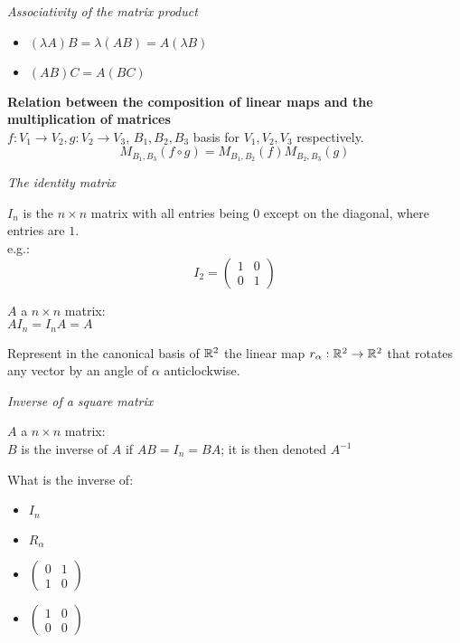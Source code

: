 \textit{Associativity of the matrix product}
\begin{itemize}
	\item $(\lambda A)B = \lambda(AB) = A(\lambda B)$
	\item $(AB)C = A(BC)$
\end{itemize}

\textbf{Relation between the composition of linear maps and the multiplication of matrices}\\
$f:V_1 \to V_2, g:V_2 \to V_3$, $B_1,B_2,B_3$ basis for $V_1,V_2,V_3$ respectively.
$$
M_{B_1,B_3}(f \circ g)=M_{B_1,B_2}(f)M_{B_2,B_3}(g)
$$

\textit{The identity matrix}
\begin{definition}
	$I_n$ is the $n \times n$ matrix with all entries being $0$ except on the diagonal, where entries are $1$.\\
	e.g.:
	$$
	I_2 = 
	\begin{pmatrix}
		1&0\\
		0&1
	\end{pmatrix}
	$$
\end{definition}
\begin{property}
	$A$ a $n \times n$ matrix:\\
	$A I_n = I_n A = A$
\end{property}

\begin{exercise}
	Represent in the canonical basis of $\mathbb{R}^2$ the linear map $r_\alpha: \mathbb{R}^2 \to \mathbb{R}^2$ that rotates any vector by an angle of $\alpha$ anticlockwise.
\end{exercise}

\textit{Inverse of a square matrix}
\begin{definition}
	$A$ a $n \times n$ matrix:\\
	$B$ is the inverse of $A$ if $AB = I_n = BA$; it is then denoted $A^{-1}$
\end{definition}
\begin{question}
	What is the inverse of:
	\begin{itemize}
		\item $I_n$
		\item $R_\alpha$
		\item $\begin{pmatrix} 0&1\\ 1&0 \end{pmatrix}$
		\item $\begin{pmatrix} 1&0\\ 0&0 \end{pmatrix}$
	\end{itemize}
\end{question}

